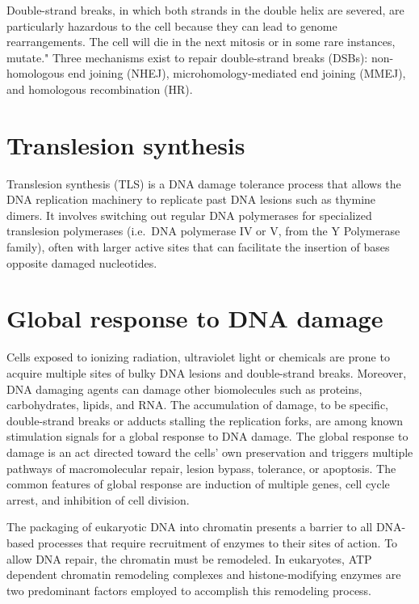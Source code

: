 Double-strand breaks, in which both strands in the double helix are severed, are particularly hazardous to the cell because they can lead to genome rearrangements. The cell will die in the next mitosis or in some rare instances, mutate." Three mechanisms exist to repair double-strand breaks (DSBs): non-homologous end joining (NHEJ), microhomology-mediated end joining (MMEJ), and homologous recombination (HR).

\hypertarget{translesion-synthesis}{%
\section{Translesion synthesis}\label{translesion-synthesis}}

Translesion synthesis (TLS) is a DNA damage tolerance process that allows the DNA replication machinery to replicate past DNA lesions such as thymine dimers. It involves switching out regular DNA polymerases for specialized translesion polymerases (i.e.~DNA polymerase IV or V, from the Y Polymerase family), often with larger active sites that can facilitate the insertion of bases opposite damaged nucleotides.

\hypertarget{global-response-to-dna-damage}{%
\section{Global response to DNA damage}\label{global-response-to-dna-damage}}

Cells exposed to ionizing radiation, ultraviolet light or chemicals are prone to acquire multiple sites of bulky DNA lesions and double-strand breaks. Moreover, DNA damaging agents can damage other biomolecules such as proteins, carbohydrates, lipids, and RNA. The accumulation of damage, to be specific, double-strand breaks or adducts stalling the replication forks, are among known stimulation signals for a global response to DNA damage. The global response to damage is an act directed toward the cells' own preservation and triggers multiple pathways of macromolecular repair, lesion bypass, tolerance, or apoptosis. The common features of global response are induction of multiple genes, cell cycle arrest, and inhibition of cell division.

The packaging of eukaryotic DNA into chromatin presents a barrier to all DNA-based processes that require recruitment of enzymes to their sites of action. To allow DNA repair, the chromatin must be remodeled. In eukaryotes, ATP dependent chromatin remodeling complexes and histone-modifying enzymes are two predominant factors employed to accomplish this remodeling process.

